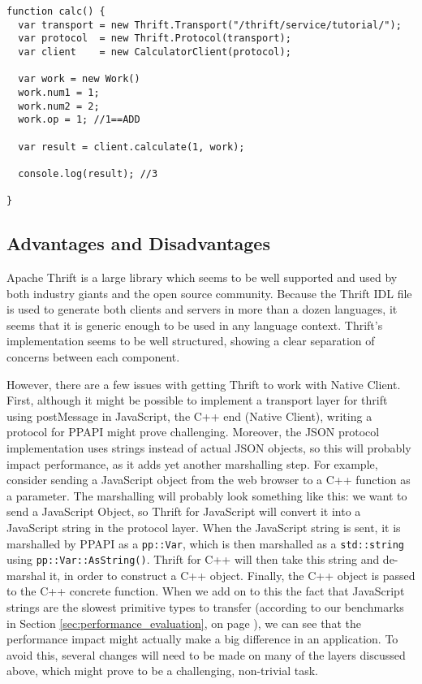 \begin{lstlisting}
function calc() {
  var transport = new Thrift.Transport("/thrift/service/tutorial/");
  var protocol  = new Thrift.Protocol(transport);
  var client    = new CalculatorClient(protocol);

  var work = new Work()
  work.num1 = 1;
  work.num2 = 2;
  work.op = 1; //1==ADD

  var result = client.calculate(1, work);

  console.log(result); //3
  
}
\end{lstlisting}


\subsection{Advantages and Disadvantages} %
\label{sub:thrift_advantages_and_disadvantages}
Apache Thrift is a large library which seems to be well supported and used by both industry giants and the open source community. Because the Thrift IDL file is used to generate both clients and servers in more than a dozen languages, it seems that it is generic enough to be used in any language context. Thrift's implementation seems to be well structured, showing a clear separation of concerns between each component. 

However, there are a few issues with getting Thrift to work with Native Client. First, although it might be possible to implement a transport layer for thrift using postMessage in JavaScript, the C++ end (Native Client), writing a protocol for PPAPI might prove challenging. Moreover, the JSON protocol implementation uses strings instead of actual JSON objects, so this will probably impact performance, as it adds yet another marshalling step. For example, consider sending a JavaScript object from the web browser to a C++ function as a parameter. The marshalling will probably look something like this: we want to send a JavaScript Object, so Thrift for JavaScript will convert it into a JavaScript string in the protocol layer. When the JavaScript string is sent, it is marshalled by PPAPI as a \lstinline{pp::Var}, which is then marshalled as a \lstinline{std::string} using \lstinline{pp::Var::AsString()}. Thrift for C++ will then take this string and de-marshal it, in order to construct a C++ object. Finally, the C++ object is passed to the C++ concrete function. When we add on to this the fact that JavaScript strings are the slowest primitive types to transfer (according to our benchmarks in Section \ref{sec:performance_evaluation}, on page \pageref{sec:performance_evaluation}), we can see that the performance impact might actually make a big difference in an application. To avoid this, several changes will need to be made on many of the layers discussed above, which might prove to be a challenging, non-trivial task.

